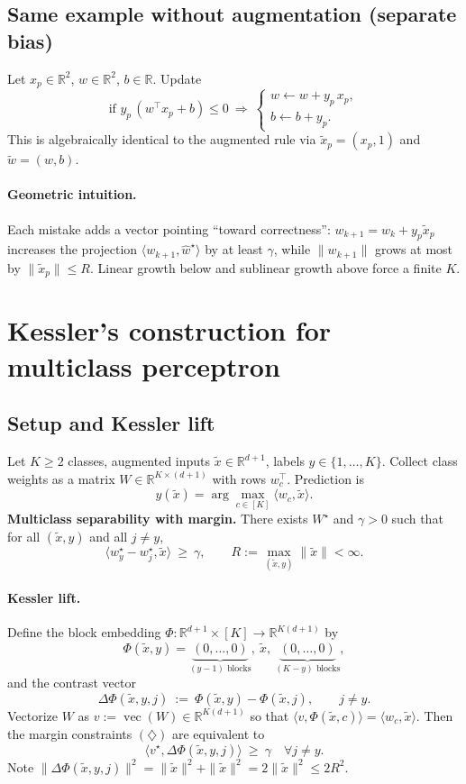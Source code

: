 \documentclass[11pt]{article}
\begin{document}
\subsection{Same example without augmentation (separate bias)}
Let $x_p\in\mathbb{R}^2$, $w\in\mathbb{R}^2$, $b\in\mathbb{R}$. Update
\[
\text{if }y_p\,(w^\top x_p+b)\le 0\ \Longrightarrow\
\begin{cases}
w\leftarrow w + y_p\,x_p,\\
b\leftarrow b + y_p.
\end{cases}
\]
This is algebraically identical to the augmented rule via $\tilde x_p=(x_p,1)$ and $\tilde w=(w,b)$.

\paragraph{Geometric intuition.}
Each mistake adds a vector pointing ``toward correctness'':
$w_{k+1}=w_k+y_p\tilde x_p$ increases the projection $\langle w_{k+1},\hat w^\star\rangle$ by at least $\gamma$, while $\|w_{k+1}\|$ grows at most by $\|\tilde x_p\|\le R$. Linear growth below and sublinear growth above force a finite $K$.





\newpage
\section{Kessler's construction for multiclass perceptron}

\subsection{Setup and Kessler lift}
Let $K\ge 2$ classes, augmented inputs $\tilde x\in\mathbb{R}^{d+1}$, labels $y\in\{1,\dots,K\}$. Collect class weights as a matrix $W\in\mathbb{R}^{K\times(d+1)}$ with rows $w_c^\top$. Prediction is
\[
\hat y(\tilde x)=\arg\max_{c\in[K]} \langle w_c,\tilde x\rangle.
\]
\textbf{Multiclass separability with margin.} There exists $W^\star$ and $\gamma>0$ such that for all $(\tilde x,y)$ and all $j\ne y$,
\[
\langle w^\star_y-w^\star_j,\tilde x\rangle\ \ge\ \gamma,
\qquad
R:=\max_{(\tilde x, y)} \|\tilde x\|<\infty.
\tag{$\diamondsuit$}
\]

\paragraph{Kessler lift.}
Define the block embedding $\Phi:\mathbb{R}^{d+1}\times[K]\to\mathbb{R}^{K(d+1)}$ by
\[
\Phi(\tilde x,y)=\underbrace{(0,\dots,0)}_{(y-1)\text{ blocks}},\ \tilde x,\ \underbrace{(0,\dots,0)}_{(K-y)\text{ blocks}},
\]
and the contrast vector
\[
\Delta\Phi(\tilde x,y,j)\ :=\ \Phi(\tilde x,y)-\Phi(\tilde x,j),\qquad j\ne y.
\]
Vectorize $W$ as $v:=\operatorname{vec}(W)\in\mathbb{R}^{K(d+1)}$ so that $\langle v,\Phi(\tilde x,c)\rangle=\langle w_c,\tilde x\rangle$. Then the margin constraints $(\diamondsuit)$ are equivalent to
\[
\langle v^\star,\Delta\Phi(\tilde x,y,j)\rangle\ \ge\ \gamma \quad \forall j\ne y.
\]
Note $\|\Delta\Phi(\tilde x,y,j)\|^2=\|\tilde x\|^2+\|\tilde x\|^2=2\|\tilde x\|^2\le 2R^2$.
\end{document}
